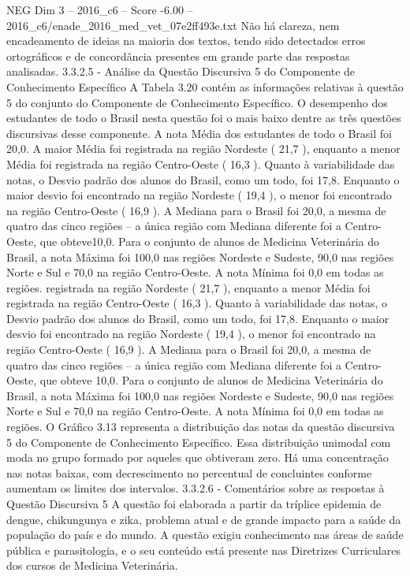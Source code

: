 \begin{textsample}{NEG Dim 3 – 2016\_c6 – Score -6.00 – 2016\_c6/enade\_2016\_med\_vet\_07e2ff493e.txt}
Não há clareza, nem encadeamento de ideias na maioria dos textos, tendo sido detectados erros ortográficos e de concordância presentes em grande parte das respostas analisadas. 3.3.2.5 - Análise da Questão Discursiva 5 do Componente de Conhecimento Específico A Tabela 3.20 contém as informações relativas à questão 5 do conjunto do Componente de Conhecimento Específico.
O desempenho dos estudantes de todo o Brasil nesta questão foi o mais baixo dentre as três questões discursivas desse componente.
A nota Média dos estudantes de todo o Brasil foi 20,0.
A maior Média foi registrada na região Nordeste ( 21,7 ), enquanto a menor Média foi registrada na região Centro-Oeste ( 16,3 ).
Quanto à variabilidade das notas, o Desvio padrão dos alunos do Brasil, como um todo, foi 17,8.
Enquanto o maior desvio foi encontrado na região Nordeste ( 19,4 ), o menor foi encontrado na região Centro-Oeste ( 16,9 ).
A Mediana para o Brasil foi 20,0, a mesma de quatro das cinco regiões – a única região com Mediana diferente foi a Centro-Oeste, que obteve10,0.
Para o conjunto de alunos de Medicina Veterinária do Brasil, a nota Máxima foi 100,0 nas regiões Nordeste e Sudeste, 90,0 nas regiões Norte e Sul e 70,0 na região Centro-Oeste.
A nota Mínima foi 0,0 em todas as regiões. registrada na região Nordeste ( 21,7 ), enquanto a menor Média foi registrada na região Centro-Oeste ( 16,3 ).
Quanto à variabilidade das notas, o Desvio padrão dos alunos do Brasil, como um todo, foi 17,8.
Enquanto o maior desvio foi encontrado na região Nordeste ( 19,4 ), o menor foi encontrado na região Centro-Oeste ( 16,9 ).
A Mediana para o Brasil foi 20,0, a mesma de quatro das cinco regiões – a única região com Mediana diferente foi a Centro-Oeste, que obteve 10,0.
Para o conjunto de alunos de Medicina Veterinária do Brasil, a nota Máxima foi 100,0 nas regiões Nordeste e Sudeste, 90,0 nas regiões Norte e Sul e 70,0 na região Centro-Oeste.
A nota Mínima foi 0,0 em todas as regiões.
O Gráfico 3.13 representa a distribuição das notas da questão discursiva 5 do Componente de Conhecimento Específico.
Essa distribuição unimodal com moda no grupo formado por aqueles que obtiveram zero.
Há uma concentração nas notas baixas, com decrescimento no percentual de concluintes conforme aumentam os limites dos intervalos. 3.3.2.6 - Comentários sobre as respostas à Questão Discursiva 5 A questão foi elaborada a partir da tríplice epidemia de dengue, chikungunya e zika, problema atual e de grande impacto para a saúde da população do país e do mundo.
A questão exigiu conhecimento nas áreas de saúde pública e parasitologia, e o seu conteúdo está presente nas Diretrizes Curriculares dos cursos de Medicina Veterinária.

\end{textsample}
